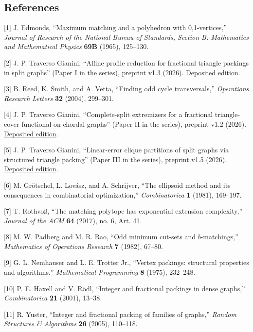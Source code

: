 \documentclass[english,11pt,a4paper]{article}
\begin{document}
\subsection{References}\label{references}

{[}1{]} J. Edmonds, ``Maximum matching and a polyhedron with
0,1-vertices,'' \emph{Journal of Research of the National Bureau of
Standards, Section B: Mathematics and Mathematical Physics} \textbf{69B}
(1965), 125--130.

{[}2{]} J. P. Traverso Gianini, ``Affine profile reduction for
fractional triangle packings in split graphs'' (Paper I in the series),
preprint v1.3 (2026).
\href{https://doi.org/10.5281/zenodo.23089131}{Deposited edition}.

{[}3{]} B. Reed, K. Smith, and A. Vetta, ``Finding odd cycle
transversals,'' \emph{Operations Research Letters} \textbf{32} (2004),
299--301.

{[}4{]} J. P. Traverso Gianini, ``Complete-split extremizers for a
fractional triangle-cover functional on chordal graphs'' (Paper II in
the series), preprint v1.2 (2026).
\href{https://doi.org/10.5281/zenodo.23089131}{Deposited edition}.

{[}5{]} J. P. Traverso Gianini, ``Linear-error clique partitions of
split graphs via structured triangle packing'' (Paper III in the
series), preprint v1.5 (2026).
\href{https://doi.org/10.5281/zenodo.23089131}{Deposited edition}.

{[}6{]} M. Grötschel, L. Lovász, and A. Schrijver, ``The ellipsoid
method and its consequences in combinatorial optimization,''
\emph{Combinatorica} \textbf{1} (1981), 169--197.

{[}7{]} T. Rothvoß, ``The matching polytope has exponential extension
complexity,'' \emph{Journal of the ACM} \textbf{64} (2017), no. 6, Art.
41.

{[}8{]} M. W. Padberg and M. R. Rao, ``Odd minimum cut-sets and
\(b\)-matchings,'' \emph{Mathematics of Operations Research} \textbf{7}
(1982), 67--80.

{[}9{]} G. L. Nemhauser and L. E. Trotter Jr., ``Vertex packings:
structural properties and algorithms,'' \emph{Mathematical Programming}
\textbf{8} (1975), 232--248.

{[}10{]} P. E. Haxell and V. Rödl, ``Integer and fractional packings in
dense graphs,'' \emph{Combinatorica} \textbf{21} (2001), 13--38.

{[}11{]} R. Yuster, ``Integer and fractional packing of families of
graphs,'' \emph{Random Structures \& Algorithms} \textbf{26} (2005),
110--118.
\end{document}
